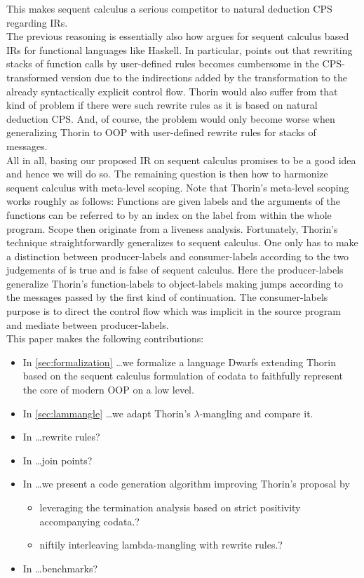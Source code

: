 This makes sequent calculus a serious competitor to natural deduction CPS regarding IRs.
\\
The previous reasoning is essentially also how \cite{downen2016sequent} argues for sequent calculus based IRs for functional languages like Haskell.
In particular, \cite{downen2016sequent} points out that rewriting stacks of function calls by user-defined rules becomes cumbersome in the CPS-transformed version due to the indirections added by the transformation to the already syntactically explicit control flow.
Thorin would also suffer from that kind of problem if there were such rewrite rules as it is based on natural deduction CPS.
And, of course, the problem would only become worse when generalizing Thorin to OOP with user-defined rewrite rules for stacks of messages.
\\
All in all, basing our proposed IR on sequent calculus promises to be a good idea and hence we will do so.
The remaining question is then how to harmonize sequent calculus with meta-level scoping.
Note that Thorin's meta-level scoping works roughly as follows:
Functions are given labels and the arguments of the functions can be referred to by an index on the label from within the whole program.
Scope then originate from a liveness analysis.
Fortunately, Thorin's technique straightforwardly generalizes to sequent calculus.
One only has to make a distinction between producer-labels and consumer-labels according to the two judgements of {\glqq}is true{\grqq} and {\glqq}is false{\grqq} of sequent calculus.
Here the producer-labels generalize Thorin's function-labels to object-labels making jumps according to the messages passed by the first kind of continuation.
The consumer-labels purpose is to direct the control flow which was implicit in the source program and mediate between producer-labels.
\\
This paper makes the following contributions:
\begin{itemize}
  \item
    In \cref{sec:formalization} \ldots we formalize a language Dwarfs extending Thorin based on the sequent calculus formulation of codata to faithfully represent the core of modern OOP on a low level.
  \item
    In \cref{sec:lammangle} \ldots we adapt Thorin's $\lambda$-mangling and compare it.
  \item
    In \ldots rewrite rules?
  \item
    In \ldots join points?
  \item
    In \ldots we present a code generation algorithm improving Thorin's proposal by
    \begin{itemize}
      \item
        leveraging the termination analysis based on strict positivity accompanying codata.?
      \item
        niftily interleaving lambda-mangling with rewrite rules.?
    \end{itemize}
  \item
    In \ldots benchmarks?
\end{itemize}
